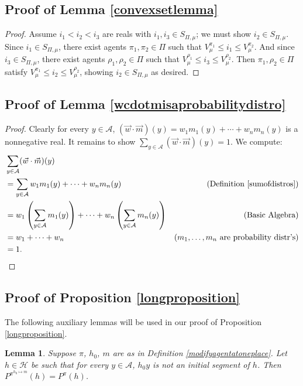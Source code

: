 \documentclass[twoside]{article}
\newtheorem{lemma}[theorem]{Lemma}
\begin{document}
\subsection{Proof of Lemma \ref{convexsetlemma}}

\begin{proof}
    Assume $i_1<i_2<i_3$ are reals with $i_1,i_3\in S_{\Pi,\mu}$; we must show
    $i_2\in S_{\Pi,\mu}$.
    Since $i_1\in S_{\Pi,\mu}$, there exist agents $\pi_1,\pi_2\in\Pi$
    such that $V^{\pi_1}_\mu\leq i_1\leq V^{\pi_2}_\mu$.
    And since $i_3\in S_{\Pi,\mu}$, there exist agents $\rho_1,\rho_2\in\Pi$
    such that $V^{\rho_1}_\mu\leq i_3\leq V^{\rho_2}_\mu$.
    Then $\pi_1,\rho_2\in \Pi$ satisfy
    $V^{\pi_1}_\mu\leq i_2\leq V^{\rho_2}_\mu$, showing $i_2\in S_{\Pi,\mu}$
    as desired.
\end{proof}

\subsection{Proof of Lemma \ref{wcdotmisaprobabilitydistro}}
\begin{proof}
    Clearly for every $y\in\mathcal A$,
    $(\vec w\cdot\vec m)(y) = w_1m_1(y) + \cdots + w_nm_n(y)$ is a nonnegative
    real. It remains to show $\sum_{y\in\mathcal A}(\vec w\cdot\vec m)(y)=1$.
    We compute:
    \begin{align*}
        &{} \sum_{y\in\mathcal A}(\vec w\cdot\vec m)(y)\\
        &=
        \sum_{y\in\mathcal A} w_1m_1(y) + \cdots + w_nm_n(y)
            &\mbox{(Definition \ref{sumofdistros})}\\
        &=
        w_1\left(\sum_{y\in\mathcal A} m_1(y)\right)
        + \cdots + w_n\left(\sum_{y\in\mathcal A}m_n(y)\right)
            &\mbox{(Basic Algebra)}\\
        &= w_1 + \cdots + w_n
            &\mbox{($m_1,\ldots,m_n$ are probability distr's)}\\
        &= 1.
    \end{align*}
\end{proof}

\subsection{Proof of Proposition \ref{longproposition}}
The following auxiliary lemmas will be used in our proof of
Proposition \ref{longproposition}.

\begin{lemma}
\label{firsttechlemmaforgenericity}
    Suppose $\pi$, $h_0$, $m$ are as in Definition \ref{modifyagentatoneplace}.
    Let $h\in\mathcal H$ be such that
    for every $y\in\mathcal A$,
    $h_0y$ is not an initial segment of $h$.
    Then $P^{\pi^{h_0\mapsto m}}(h)=P^\pi(h)$.
\end{lemma}
\end{document}
